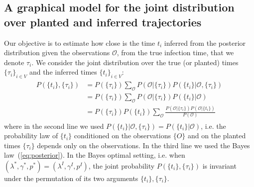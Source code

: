 \documentclass[a4paper, amsfonts, amssymb, amsmath, reprint, showkeys, nofootinbib, twoside, floatfix, pre,superscriptaddress]{revtex4-2}
\begin{document}
\subsection{A graphical model for the joint distribution over planted and inferred trajectories}
Our objective is to estimate how close is the time $t_i$ inferred from the posterior distribution given the observations $\mathcal{O}$, from the true infection time, that we denote $\tau_i$. 
We consider the joint distribution over the true (or planted) times $\{\tau_i\}_{i\in V}$ and the inferred times $\{t_i\}_{i\in V}$:
\begin{align}
\label{eq:joint}
\begin{aligned}
	P(\{t_i\}, \{\tau_i\}) &= P(\{\tau_i\})\sum_{\mathcal{O}}P(\mathcal{O}|\{\tau_i\})P(\{t_i\}|\mathcal{O},\{\tau_i\})\\
	&= P(\{\tau_i\})\sum_{\mathcal{O}}P(\mathcal{O}|\{\tau_i\})P(\{t_i\}|\mathcal{O})\\
	&=P(\{\tau_i\})P(\{t_i\})\sum_{\mathcal{O}}\frac{P(\mathcal{O}|\{\tau_i\})P(\mathcal{O}|\{t_i\})}{P(\mathcal{O})}
\end{aligned}
\end{align}
where in the second line we used $P(\{t_i\}|\mathcal{O},\{\tau_i\})=P(\{t_i\}|\mathcal{O})$, i.e. the probability law of $\{t_i\}$ conditioned on the observations $\{O\}$ and on the planted times $\{\tau_i\}$ depends only on the observations. In the third line we used the Bayes law~(\ref{eq:posterior}).
In the Bayes optimal setting, i.e. when $(\lambda^*, \gamma^*, p^*)=(\lambda^I, \gamma^I, p^I)$, the joint probability $P(\{t_i\}, \{\tau_i\})$ is invariant under the permutation of its two arguments $\{t_i\}, \{\tau_i\}$.
\end{document}
